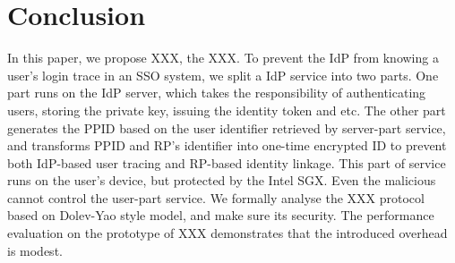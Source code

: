 \section{Conclusion}
\label{sec:conclusion}
In this paper, we propose XXX, the XXX. To prevent the IdP from knowing a user's login trace in an SSO system, we split a IdP service into two parts. One part runs on the IdP server, which takes the responsibility of authenticating users, storing the private key, issuing the identity token and etc. The other part generates the PPID based on the user identifier retrieved by server-part service, and transforms PPID and RP's identifier into one-time encrypted ID to prevent both IdP-based user tracing and RP-based identity linkage. This part of service runs on the user's device, but protected by the Intel SGX. Even the malicious cannot control the user-part service. 
We formally analyse the XXX protocol based on Dolev-Yao style model, and make sure its security. 
The performance evaluation on the prototype of XXX demonstrates that the introduced overhead is modest. 